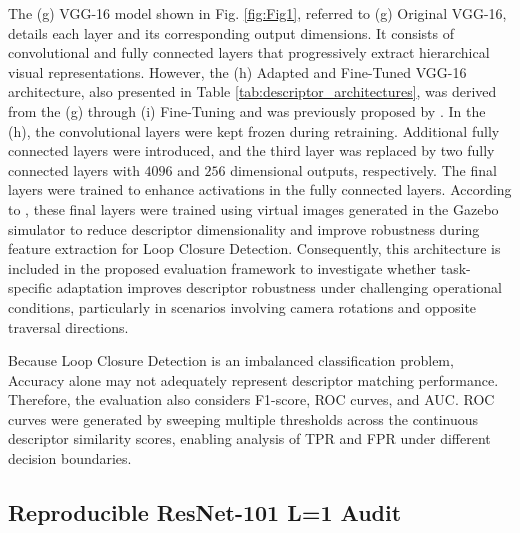 \documentclass{ieeeaccess}
\DeclareRobustCommand{\revinline}[1]{%
  \begingroup
  \setlength{\fboxsep}{1pt}%
  \colorbox{white}{\color{revisionred}\strut #1}%
  \endgroup
}
\providecommand{\revinline}[1]{#1}
\renewcommand{\revinline}[1]{{\color{revisionred}#1}}
\begin{document}
The (g) VGG-16 model shown in Fig. \ref{fig:Fig1}, referred to (g) Original VGG-16, details each layer and its corresponding output dimensions. It consists of convolutional and fully connected layers that progressively extract hierarchical visual representations. However, the (h) Adapted and Fine-Tuned VGG-16 architecture, also presented in Table \ref{tab:descriptor_architectures}, was derived from the (g) through (i) Fine-Tuning and was previously proposed by \cite{Iegawa2023LoopClosureCNN}. In the (h), the convolutional layers were kept frozen during retraining. Additional fully connected layers were introduced,
and the third layer was replaced by two fully connected layers with $4096$ and $256$ dimensional outputs, respectively. The final layers were trained to enhance activations in the fully connected layers.  According to \cite{Iegawa2023LoopClosureCNN}, these final layers were trained using virtual images generated in the Gazebo simulator to reduce descriptor dimensionality and improve robustness during feature extraction for Loop Closure Detection. Consequently, this architecture is included in the proposed evaluation framework to investigate whether task-specific adaptation improves descriptor robustness under challenging operational conditions, particularly in scenarios involving camera rotations and opposite traversal directions. 

Because Loop Closure Detection is an imbalanced classification problem, Accuracy alone may not adequately represent descriptor matching performance. Therefore, the evaluation also considers F1-score, ROC curves, and AUC. ROC curves were generated by sweeping multiple thresholds across the continuous descriptor similarity scores, enabling analysis of TPR and FPR under different decision boundaries.



\subsection{\revinline{Reproducible ResNet-101 L=1 Audit}}
\label{sec:resnet_l1_audit}
\end{document}
